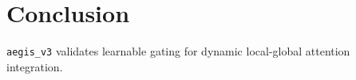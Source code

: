 \section{Conclusion}\texttt{aegis\_v3} validates learnable gating for dynamic local-global attention integration.
